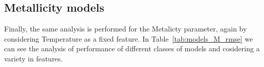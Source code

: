 % 
% 


\subsection{Metallicity models} 

Finally, the same analysis is performed for the Metalicty parameter, 
again by considering Temperature as a fixed feature.
In Table~\ref{tab:models_M_rmse} 
we can see the analysis of performance of different classes of
models and cosidering a variety in features.

